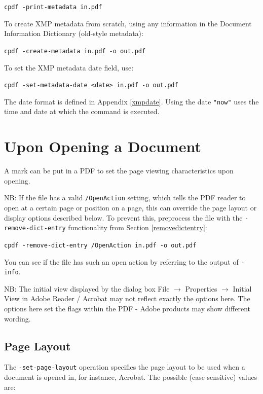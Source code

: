 \documentclass{book}
\begin{document}
  \begin{framed}
    \noindent\small\verb!cpdf -print-metadata in.pdf!
  \end{framed}

  \noindent To create XMP metadata from scratch, using any information in the Document Information Dictionary (old-style metadata):

  \begin{framed}
    \noindent\small\verb!cpdf -create-metadata in.pdf -o out.pdf!
  \end{framed}

  \noindent To set the XMP metadata date field, use:

  \begin{framed}
    \noindent\small\verb!cpdf -set-metadata-date <date> in.pdf -o out.pdf!
  \end{framed}

\noindent The date format is defined in Appendix \ref{xmpdate}. Using the date \texttt{"now"} uses the time and date
at which the command is executed.


\section{Upon Opening a Document}

A mark can be put in a PDF to set the page viewing characteristics upon opening.

NB: If the file has a valid \texttt{/OpenAction} setting, which tells the PDF reader to open at a certain page or position on a page, this can override the page layout or display options described below. To prevent this, preprocess the file with the \texttt{-remove-dict-entry} functionality from Section \ref{removedictentry}:

  \begin{framed}
    \noindent\small\verb!cpdf -remove-dict-entry /OpenAction in.pdf -o out.pdf!
  \end{framed}

\noindent You can see if the file has such an open action by referring to the output of \texttt{-info}.

NB: The initial view displayed by the dialog box File $\rightarrow$ Properties $\rightarrow$ Initial View in Adobe Reader / Acrobat may not reflect exactly the options here. The options here set the flags within the PDF - Adobe products may show different wording.

  \subsection{Page Layout}
  The \texttt{-set-page-layout} operation specifies the page layout to be used
when a document is opened in, for instance, Acrobat. The possible
(case-sensitive) values are:
\end{document}
